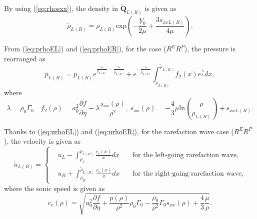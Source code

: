 \documentclass[review]{elsarticle}
\numberwithin{equation}{section}
\numberwithin{table}{section}
\begin{document}
By using (\ref{eq:rhosxx}), the density in $\tilde{\mathbf{Q}}_{L(R)}$ is given as
\begin{equation*}
\tilde{\rho}_{L(R)} = \rho_{L(R)} \text{exp}\left(-\frac{Y_0}{2\mu}+\frac{3 s_{xxL(R)}}{4\mu}\right).
\end{equation*}

From (\ref{eq:prhoEL}) and (\ref{eq:prhoER}), for the case ($R^{E}R^{P}$), the pressure is rearranged as
\begin{equation}\label{rerpp}
  \tilde{p}_{L(R)} =
	  p_{L(R)}e^{\frac{\lambda}{\rho_{L(R)}}-\frac{\lambda}{\tilde{\rho}_{L(R)}}} +e^{-\frac{\lambda}{\tilde{\rho}_{L(R)}}}\int_{\rho_{L(R)}}^{\tilde{\rho}_{L(R)}} f_2(x) e^{\frac{\lambda}{x}}dx, %
\end{equation}
where
\begin{equation*}
  \lambda = \rho_0 \Gamma_0 \quad f_2(\rho) = a_0^2\frac{\partial f}{\partial \eta}- \lambda\frac{s_{xx}(\rho)}{\rho^2}, \ s_{xx}(\rho) =	 -\frac{4}{3}\mu\text{ln}\left(\frac{\rho}{\rho_{L(R)}}\right)+s_{xxL(R)}.
\end{equation*}


Thanks to (\ref{eq:urhoEL}) and (\ref{eq:urhoER}), for the rarefaction wave case ($R^{E}R^{P}$), the velocity is given as
\begin{equation} \label{rerpu}
  \tilde{u}_{L(R)} =\left\{ \begin{aligned}
	&u_L - \int_{\rho_L}^{\tilde{\rho}_{L(R)}} \frac{c_e(x)}{x} dx \quad  & \text{for the  left-going rarefaction wave}
 , \\
 &u_R + \int_{\rho_R}^{\tilde{\rho}_{L(R)}} \frac{c_e(x)}{x} dx \quad &  \text{for the right-going rarefaction wave} ,
	\end{aligned}
  \right. %
\end{equation}
where the sonic speed is given as
\begin{equation*}
  c_e(\rho) =
	  \sqrt{a_0^2 \frac{\partial f}{\partial \eta} + \frac{p(\rho)}{\rho^2}\rho_0\Gamma_0 -\frac{\rho_0}{\rho^2}\Gamma_0 s_{xx}(\rho) +\frac{4}{3}\frac{\mu}{\rho}}. %
\end{equation*}

\end{document}
